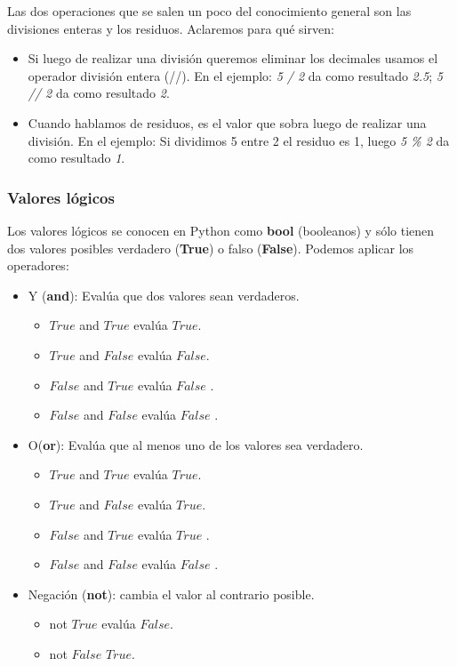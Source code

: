 Las dos operaciones que se salen un poco del conocimiento general son las divisiones enteras y los residuos. Aclaremos para qué sirven: 

\begin{itemize}
\item Si luego de realizar una división queremos eliminar los decimales usamos el operador división entera (//). En el ejemplo: \emph{5 / 2} da como resultado \emph{2.5}; \emph{5 // 2} da como resultado \emph{2}.

\item Cuando hablamos de residuos, es el valor que sobra luego de realizar una división. En el ejemplo: Si dividimos 5 entre 2 el residuo es 1, luego \emph{5 \% 2} da como resultado \emph{1}.
\end{itemize}


\subsubsection{Valores lógicos}

Los valores lógicos se conocen en Python como \textbf{bool} (booleanos) y sólo tienen dos valores posibles verdadero (\textbf{True}) o falso (\textbf{False}). Podemos aplicar los operadores:

\newpage
\begin{itemize}
\item Y (\textbf{and}): Evalúa que dos valores sean verdaderos.
	\begin{itemize}
	\item $True$ and $True$ evalúa $True$.
	\item $True$ and $False$ evalúa $False$.
	\item $False$ and $True$ evalúa $False$ .
	\item $False$ and $False$ evalúa $False$ .
	\end{itemize}
\item  O(\textbf{or}): Evalúa que al menos uno de los valores sea verdadero.
	\begin{itemize}
	\item $True$ and $True$ evalúa $True$.
	\item $True$ and $False$ evalúa $True$.
	\item $False$ and $True$ evalúa $True$ .
	\item $False$ and $False$ evalúa $False$ .
	\end{itemize}
\item Negación (\textbf{not}): cambia el valor al contrario posible.
	\begin{itemize}
	\item not $True$ evalúa $False$.
	\item not $False$ $True$.
	\end{itemize}
\end{itemize}

